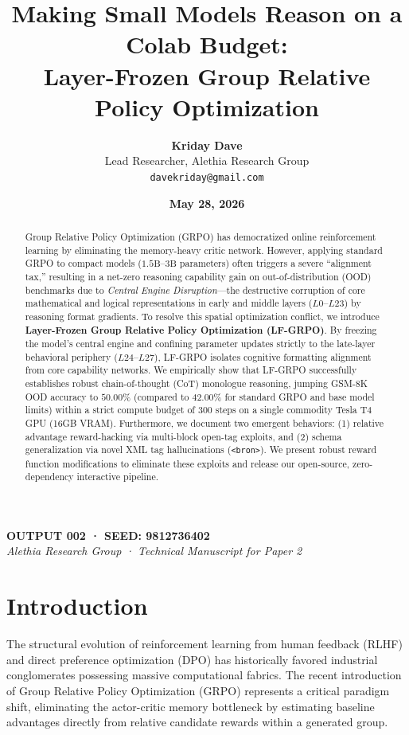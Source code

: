 \documentclass[11pt]{article}
\title{\textbf{Making Small Models Reason on a Colab Budget: \\ Layer-Frozen Group Relative Policy Optimization}}
\author{
  \textbf{Kriday Dave} \\
  Lead Researcher, Alethia Research Group \\
  \texttt{davekriday@gmail.com}
}
\date{\textbf{May 28, 2026}}
\begin{document}
\maketitle

\begin{abstract}
Group Relative Policy Optimization (GRPO) has democratized online reinforcement learning by eliminating the memory-heavy critic network. However, applying standard GRPO to compact models ($1.5\text{B}$--$3\text{B}$ parameters) often triggers a severe ``alignment tax,'' resulting in a net-zero reasoning capability gain on out-of-distribution (OOD) benchmarks due to \textit{Central Engine Disruption}---the destructive corruption of core mathematical and logical representations in early and middle layers ($L0$--$L23$) by reasoning format gradients. To resolve this spatial optimization conflict, we introduce \textbf{Layer-Frozen Group Relative Policy Optimization (LF-GRPO)}. By freezing the model's central engine and confining parameter updates strictly to the late-layer behavioral periphery ($L24$--$L27$), LF-GRPO isolates cognitive formatting alignment from core capability networks. We empirically show that LF-GRPO successfully establishes robust chain-of-thought (CoT) monologue reasoning, jumping GSM-8K OOD accuracy to $\mathbf{50.00\%}$ (compared to $42.00\%$ for standard GRPO and base model limits) within a strict compute budget of $300$ steps on a single commodity Tesla T4 GPU (16GB VRAM). Furthermore, we document two emergent behaviors: (1) relative advantage reward-hacking via multi-block open-tag exploits, and (2) schema generalization via novel XML tag hallucinations (\texttt{<bron>}). We present robust reward function modifications to eliminate these exploits and release our open-source, zero-dependency interactive pipeline.
\end{abstract}

\vfill
\noindent\small{\textbf{OUTPUT 002 · SEED: 9812736402} \\
\textit{Alethia Research Group · Technical Manuscript for Paper 2}}

\newpage

\section{Introduction}

The structural evolution of reinforcement learning from human feedback (RLHF) and direct preference optimization (DPO) has historically favored industrial conglomerates possessing massive computational fabrics. The recent introduction of Group Relative Policy Optimization (GRPO) \cite{deepseek2025} represents a critical paradigm shift, eliminating the actor-critic memory bottleneck by estimating baseline advantages directly from relative candidate rewards within a generated group. 
\end{document}
